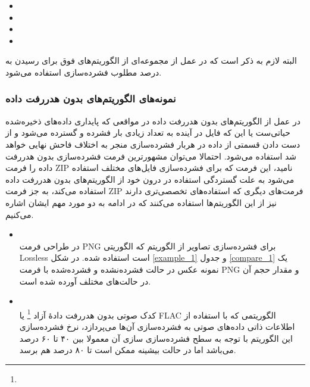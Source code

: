 \begin{itemize}
	\item {}
	\item {}
	\item {}
	\item {}
\end{itemize}

البته لازم به ذکر است که در عمل از مجموعه‌ای از الگوریتم‌های فوق برای رسیدن به درصد مطلوب فشرده‌سازی استفاده می‌شود.

\subsubsection{نمونه‌های الگوریتم‌های بدون هدررفت داده}
در عمل از الگوریتم‌های بدون هدررفت داده در مواقعی که 
پایداری داده‌های ذخیره‌شده حیاتی‌ست یا این که فایل در آینده به تعداد زیادی بار فشرده و گسترده می‌شود و از دست دادن قسمتی از داده در
هربار فشرده‌سازی منجر به اختلاف فاحش نهایی خواهد شد استفاده می‌شود. احتمالا می‌توان مشهورترین فرمت فشرده‌سازی بدون هدررفت داده را
فرمت 
ZIP
نامید، این فرمت که برای فشرده‌سازی فایل‌های مختلف استفاده می‌شود به علت گستردگی استفاده در درون خود از 
الگوریتم‌های بدون هدررفت داده استفاده می‌کند، به جز فرمت ZIP 
فرمت‌های دیگری که استفاده‌های تخصصی‌تری دارند نیز از این الگوریتم‌ها استفاده می‌کنند که در ادامه به دو مورد مهم ایشان اشاره می‌کنیم.

\begin{itemize}
	\item {}\\
	در طراحی فرمت PNG برای فشرده‌سازی تصاویر از الگوریتم
	که الگوریتی Lossless است استفاده شده. 
	در 
	شکل 	\ref{example_1} و 
	جدول 	\ref{compare_1} 
	یک نمونه عکس در حالت فشرده‌نشده و فشرده‌شده با فرمت PNG
	و مقدار حجم آن در حالت‌های مختلف آورده شده است.

	\item {}\\
	کدک صوتی بدون هدررفت دادهٔ آزاد \footnote{} یا FLAC
	الگوریتمی که با استفاده از اطلاعات ذاتی داده‌های صوتی به فشرده‌سازی آن‌ها می‌پردازد، نرخ فشرده‌سازی این الگوریتم با توجه به 
	سطح فشرده‌سازی سازی آن معمولا بین ۴۰ تا ۶۰ درصد می‌باشد اما در حالت بیشینه ممکن است تا ۸۰ درصد هم برسد.
	
\end{itemize}

